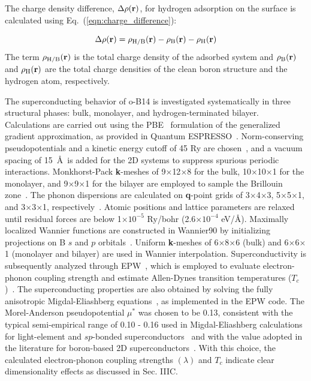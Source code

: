 \documentclass[aps,prb,preprint,notitlepage]{revtex4-2}
\begin{document}
The charge density difference, $\Delta \rho(\bf{r})$, for hydrogen adsorption on the surface is calculated using Eq.~(\ref{eqn:charge_difference}):


\begin{equation}
    \Delta \rho (\bf{r}) = \rho_{\mathrm{H/B}}(\bf{r}) - \rho_{\mathrm{B}}(\bf{r}) - \rho_{\mathrm{H}}(\bf{r})
    \label{eqn:charge_difference}
\end{equation}
The term
$\rho_{\mathrm{H/B}}(\bf{r})$ is the total charge density of the adsorbed system and $\rho_{\mathrm{B}}(\bf{r})$ and $\rho_{\mathrm{H}}(\bf{r})$  are the total charge densities of the clean boron structure and the hydrogen atom, respectively.    

The superconducting behavior of o-B14 is investigated systematically in 
three structural phases: bulk, monolayer, and hydrogen-terminated bilayer. 
Calculations are carried out 
using the PBE~\cite{PBE-1996} 
formulation of the generalized gradient approximation, as provided in 
Quantum ESPRESSO~\cite{giannozzi2009quantum}.  
Norm-conserving pseudopotentials and a kinetic 
energy cutoff of 45 Ry are chosen~\cite{hamann2013optimized}, and a vacuum spacing of 15~\AA\,
is added for the 2D systems to suppress spurious periodic 
interactions. Monkhorst-Pack {\bf k}-meshes of 9$\times$12$\times$8 for the bulk, 
10$\times$10$\times$1 for the monolayer, and 9$\times$9$\times$1 for the 
bilayer are employed to sample the Brillouin zone~\cite{methfessel1989high}. The phonon 
dispersions are calculated on {\bf q}-point grids of 
3$\times$4$\times$3, 5$\times$5$\times$1, and 3$\times$3$\times$1, 
respectively~\cite{baroni2001phonons}. Atomic positions and lattice parameters are 
relaxed until residual forces are below 1$\times 10^{-5}$ Ry/bohr (2.6$\times 10^{-4}$ eV/\AA). 
Maximally localized Wannier functions are constructed in Wannier90 by 
initializing projections on B $s$ and $p$ orbitals~\cite{pizzi2020wannier90}. Uniform 
{\bf k}-meshes of 6$\times$8$\times$6 (bulk) and 6$\times$6$\times$1 
(monolayer and bilayer) are used in Wannier interpolation. Superconductivity 
is subsequently analyzed through 
EPW~\cite{giannozzi2009quantum,giannozzi2020quantum,giannozzi2017advanced},
which is employed to 
evaluate electron-phonon coupling strength and estimate Allen-Dynes transition 
temperatures ($T_c$)~\cite{margine2013anisotropic}. 
The superconducting properties are also obtained by solving the fully anisotropic Migdal-Eliashberg equations~\cite{bardeen1955electron,giustino2017electron,margine2013anisotropic}, as implemented in the EPW code.
The Morel-Anderson pseudopotential 
$\mu^{*}$ was chosen to be 0.13, consistent with the 
typical semi-empirical range of 0.10 - 0.16 used in Migdal-Eliashberg 
calculations for light-element and $sp$-bonded superconductors~\cite{allen-dynes} and with the value adopted in the literature for boron-based 2D superconductors~\cite{zhao2019two}. With this choice,
the calculated electron-phonon coupling strengths 
$(\lambda)$  and $T_c$ indicate clear dimensionality effects as discussed 
in Sec. IIIC.
\end{document}

